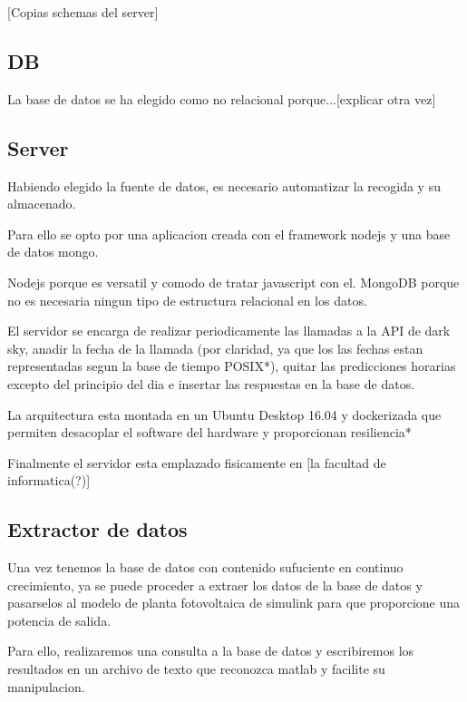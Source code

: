 [Copias schemas del server]


\subsection{DB} %
\label{sub:DB}

La base de datos se ha elegido como no relacional porque...[explicar otra vez]

\subsection{Server} %
\label{sub:server}

Habiendo elegido la fuente de datos, es necesario automatizar la recogida y su almacenado.

Para ello se opto por una aplicacion creada con el framework nodejs y una base de datos mongo.

Nodejs porque es versatil y comodo de tratar javascript con el.
MongoDB porque no es necesaria ningun tipo de estructura relacional en los datos.

El servidor se encarga de realizar periodicamente las llamadas a la API de dark sky, anadir la fecha de la llamada (por claridad, ya que los las fechas estan representadas segun la base de tiempo POSIX*), quitar las predicciones horarias excepto del principio del dia e insertar las respuestas en la base de datos.

La arquitectura esta montada en un Ubuntu Desktop 16.04 y dockerizada que permiten desacoplar el software del hardware y proporcionan resiliencia*

Finalmente el servidor esta emplazado fisicamente en [la facultad de informatica(?)] 



\subsection{Extractor de datos} %
\label{sub:extractor_de_datos}

Una vez tenemos la base de datos con contenido sufuciente en continuo crecimiento, ya se puede proceder a extraer los datos de la base de datos y pasarselos al modelo de planta fotovoltaica de simulink para que proporcione una potencia de salida.

Para ello, realizaremos una consulta a la base de datos y escribiremos los resultados en un archivo de texto que reconozca matlab y facilite su manipulacion.

